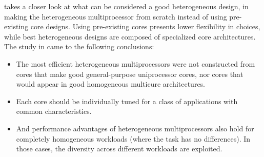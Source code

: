 


\cite{heterogeneous-arch} takes a closer look at what can be considered a good heterogeneous design, in making the heterogeneous multiprocessor from scratch instead of using pre-existing core designs.
Using pre-existing cores presents lower flexibility in choices, while best heterogeneous designs are composed of specialized core architectures.
The study in \cite{heterogeneous-arch} came to the following conclusions:
\begin{itemize}
\item The most efficient heterogeneous multiprocessors were not constructed from cores that make good general-purpose uniprocessor cores, nor cores that would appear in good homogeneous multicure architectures.
\item Each core should be individually tuned for a class of applications with common characteristics.
\item And performance advantages of heterogeneous multiprocessors also hold for completely homogeneous workloads (where the task has no differences).
    In those cases, the diversity across different workloads are exploited.
\end{itemize}

